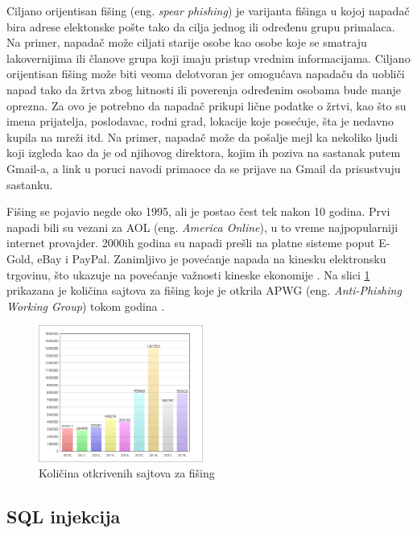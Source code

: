 \documentclass[a4paper]{article}
\theoremstyle{break}
\begin{document}
{Ciljano orijentisan fišing (eng. {\em spear phishing}) je varijanta fišinga u kojoj napadač bira adrese elektonske pošte tako da cilja jednog ili određenu grupu primalaca. Na primer, napadač može ciljati starije osobe kao osobe koje se smatraju lakovernijima ili članove grupa koji imaju pristup vrednim informacijama. Ciljano orijentisan fišing može biti veoma delotvoran jer omogućava napadaču da uobliči napad tako da žrtva zbog hitnosti ili poverenja određenim osobama bude manje oprezna. Za ovo je potrebno da napadač prikupi lične podatke o žrtvi, kao što su imena prijatelja, poslodavac, rodni grad, lokacije koje posećuje, šta je nedavno kupila na mreži itd.
Na primer, napadač može da pošalje mejl ka nekoliko ljudi koji izgleda kao da je od njihovog direktora, kojim ih poziva na sastanak putem Gmail-a, a link u poruci navodi primaoce da se prijave na Gmail da prisustvuju sastanku. 

Fišing se pojavio negde oko 1995, ali je postao čest tek nakon 10 godina. Prvi napadi bili su vezani za AOL (eng. {\em America Online}), u to vreme najpopularniji internet provajder\cite {phishing_aol}. 2000ih godina su napadi prešli na platne sisteme poput E-Gold, eBay i PayPal.
Zanimljivo je povećanje napada na kinesku elektronsku trgovinu, što ukazuje na povećanje važnosti kineske ekonomije \cite{knjiga}.
Na slici \ref{fig:phishing_napadi} prikazana je količina sajtova za fišing koje je otkrila APWG (eng. {\em Anti-Phishing Working Group}) tokom godina \cite{apwg}.

\begin{figure}[h!]
\begin{center}
\includegraphics[width=0.48\textwidth]{phishing.png}
\end{center}
\caption{Količina otkrivenih sajtova za fišing}
\label{fig:phishing_napadi}
\end{figure}
\subsection{SQL injekcija}
\label{subsec:sql}

}
\end{document}
